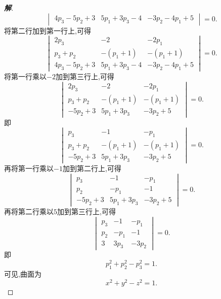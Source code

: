 \documentclass[a4paper]{article}
\begin{document}
\begin{proof}[\textbf{解}]
$$\begin{vmatrix}
4p_3-5p_2+3&5p_1+3p_3-4&-3p_2-4p_1+5
\end{vmatrix}=0.
$$
将第二行加到第一行上,可得
$$
\begin{vmatrix}
2p_3&-2&-2p_1\\
p_3+p_2&-(p_1+1)&-(p_1+1)\\
4p_3-5p_2+3&5p_1+3p_3-4&-3p_2-4p_1+5  
\end{vmatrix}=0.
$$
将第一行乘以$-2$加到第三行上,可得
$$
\begin{vmatrix}
2p_3&-2&-2p_1\\
p_3+p_2&-(p_1+1)&-(p_1+1)\\
-5p_2+3&5p_1+3p_3&-3p_2+5  
\end{vmatrix}=0.
$$
即
$$
\begin{vmatrix}
p_3&-1&-p_1\\
p_3+p_2&-(p_1+1)&-(p_1+1)\\
-5p_2+3&5p_1+3p_3&-3p_2+5  
\end{vmatrix}=0.
$$
再将第一行乘以$-1$加到第二行上,可得
$$
\begin{vmatrix}
p_3&-1&-p_1\\
p_2&-p_1&-1\\
-5p_2+3&5p_1+3p_3&-3p_2+5  
\end{vmatrix}=0.
$$
再将第二行乘以$5$加到第三行上,可得
$$
\begin{vmatrix}
p_3&-1&-p_1\\
p_2&-p_1&-1\\
3&3p_3&-3p_2
\end{vmatrix}=0.
$$
即
$$
p_1^2+p_2^2-p_3^2=1.
$$
可见,曲面为
$$
x^2+y^2-z^2=1.
$$
\end{proof}
\end{document}
